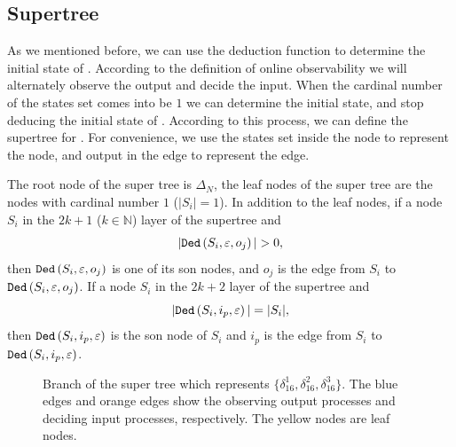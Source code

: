 \subsection{Supertree} As we mentioned before, we can use the deduction function to determine the initial state of \BCNs. According to the definition of online observability we will alternately observe the output and decide the input. When the  cardinal number of the states set comes into be $1$ we can determine the initial state, and stop deducing the initial state of \BCNs. According to this process, we can define the supertree for \BCNs. For convenience, we use the states set inside the node to represent the node, and output in the edge to represent the edge.
\begin{definition}
The root node of the super tree is $\Delta_N$, the leaf nodes of the super tree are the nodes with cardinal number $1$ ($|S_i|=1$). In addition to the leaf nodes, if a node $S_i$ in the $2k + 1$ ($k\in \mathbb{N}$) layer of the supertree and 
\[|\Ded\left(S_i,\varepsilon, o_j\right)|>0,\]
 then ${\tt Ded}\left(S_i,\varepsilon, o_j\right)$ is one of its son nodes, and $o_j$ is the edge from $S_i$ to ${\tt Ded}\left(S_i,\varepsilon, o_j\right)$. If a node $S_i$ in the $2k+2$ layer of the supertree and  
\[|{\tt Ded}\left(S_i,i_p,\varepsilon\right)|=|S_i|,\] 
then ${\tt Ded}\left(S_i,i_p,\varepsilon\right)$ is the son node of $S_i$ and $i_p$ is the edge from $S_i$ to ${\tt Ded}\left(S_i,i_p,\varepsilon\right)$. 
\end{definition}

  \begin{figure}[thpb]
      \centering
      
      \caption{Branch of the super tree which represents $\{\delta_{16}^1,\delta_{16}^2,\delta_{16}^3\}$. The blue edges and orange edges show the observing output processes and deciding input processes, respectively. The yellow nodes are leaf nodes.}
      \label{fig:3}
   \end{figure}

